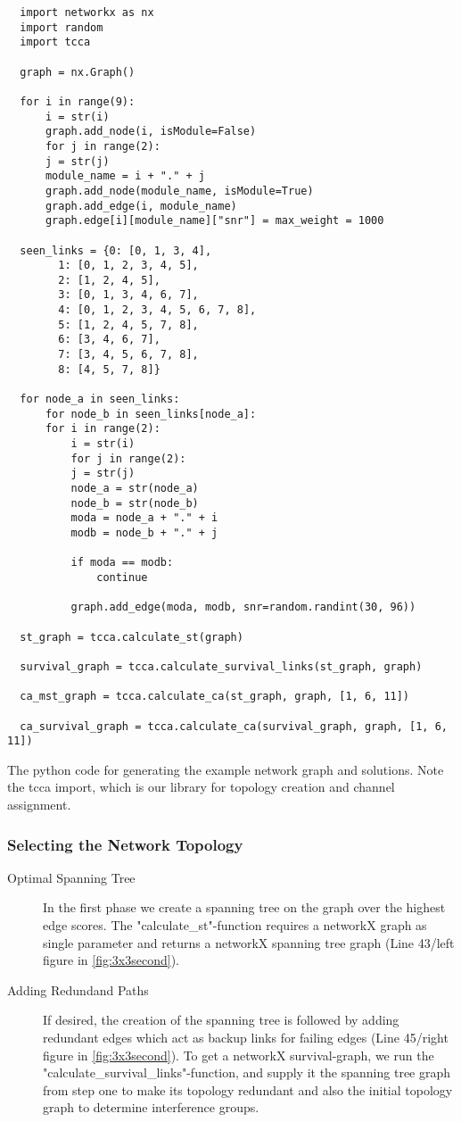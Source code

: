      \begin{table}
	\lstset{language=Python}
	\begin{lstlisting}
  import networkx as nx
  import random
  import tcca

  graph = nx.Graph()

  for i in range(9):
      i = str(i)
      graph.add_node(i, isModule=False)
      for j in range(2):
	  j = str(j)
	  module_name = i + "." + j
	  graph.add_node(module_name, isModule=True)
	  graph.add_edge(i, module_name)
	  graph.edge[i][module_name]["snr"] = max_weight = 1000

  seen_links = {0: [0, 1, 3, 4], 
		1: [0, 1, 2, 3, 4, 5], 
		2: [1, 2, 4, 5], 
		3: [0, 1, 3, 4, 6, 7], 
		4: [0, 1, 2, 3, 4, 5, 6, 7, 8], 
		5: [1, 2, 4, 5, 7, 8], 
		6: [3, 4, 6, 7], 
		7: [3, 4, 5, 6, 7, 8], 
		8: [4, 5, 7, 8]}

  for node_a in seen_links:
      for node_b in seen_links[node_a]:
	  for i in range(2):
	      i = str(i)
	      for j in range(2):
		  j = str(j)
		  node_a = str(node_a)
		  node_b = str(node_b)
		  moda = node_a + "." + i
		  modb = node_b + "." + j

		  if moda == modb:
		      continue

		  graph.add_edge(moda, modb, snr=random.randint(30, 96))

  st_graph = tcca.calculate_st(graph)

  survival_graph = tcca.calculate_survival_links(st_graph, graph)

  ca_mst_graph = tcca.calculate_ca(st_graph, graph, [1, 6, 11])

  ca_survival_graph = tcca.calculate_ca(survival_graph, graph, [1, 6, 11])
	\end{lstlisting}
	\caption{The python code for generating the example network graph and solutions. Note the tcca import, 
	which is our library for topology creation and channel assignment.}
      \end{table}
      
      \subsubsection{Selecting the Network Topology}
	\begin{description}
	  \item [Optimal Spanning Tree]
	    In the first phase we create a spanning tree on the graph over the highest edge scores.
	    The "calculate\_st"-function requires a networkX graph as single parameter and returns a networkX spanning tree graph (Line 43/left figure in \ref{fig:3x3second}).
	    
	  \item[Adding Redundand Paths]
	    If desired, the creation of the spanning tree is followed by adding redundant edges which act as backup links 
	    for failing edges (Line 45/right figure in \ref{fig:3x3second}). 
	    To get a networkX survival-graph, we run the "calculate\_survival\_links"-function,
	    and supply it the spanning tree graph from step one to make its topology redundant and also 
	    the initial topology graph to determine interference groups.
	    
	\end{description}
